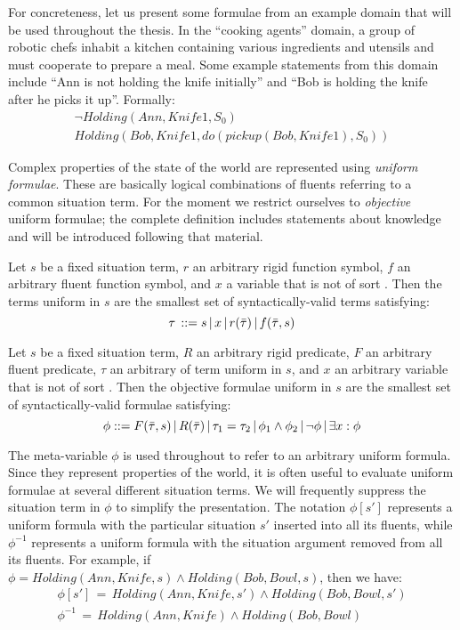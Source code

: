 \medskip{}


For concreteness, let us present some formulae from an example domain
that will be used throughout the thesis. In the {}``cooking agents''
domain, a group of robotic chefs inhabit a kitchen containing various
ingredients and utensils and must cooperate to prepare a meal. Some
example statements from this domain include {}``Ann is not holding
the knife initially'' and {}``Bob is holding the knife after he
picks it up''. Formally:\begin{gather*}
\neg Holding(Ann,Knife1,S_{0})\\
Holding(Bob,Knife1,do(pickup(Bob,Knife1),S_{0}))\end{gather*}


\medskip{}


Complex properties of the state of the world are represented using
\emph{uniform formulae}. These are basically logical combinations
of fluents referring to a common situation term. For the moment we
restrict ourselves to \emph{objective} uniform formulae; the complete
definition includes statements about knowledge and will be introduced
following that material.

\begin{defnL}
 Let $s$ be a fixed situation term, $r$
an arbitrary rigid function symbol, $f$ an arbitrary fluent function
symbol, and $x$ a variable that is not of sort .
Then the terms uniform in $s$ are the smallest set of syntactically-valid
terms satisfying:\[
\tau\,::=s\,|\, x\,|\, r(\bar{\tau})\,|\, f(\bar{\tau},s)\]

\begin{defnL}
 Let $s$ be a fixed situation
term, $R$ an arbitrary rigid predicate, $F$ an arbitrary fluent
predicate, $\tau$ an arbitrary of term uniform in $s$, and $x$
an arbitrary variable that is not of sort . Then the
objective formulae uniform in $s$ are the smallest set of syntactically-valid
formulae satisfying:\[
\phi::=F(\bar{\tau},s)\,|\, R(\bar{\tau})\,|\,\tau_{1}=\tau_{2}\,|\,\phi_{1}\wedge\phi_{2}\,|\,\neg\phi\,|\,\exists x:\phi\]

\end{defnL}
\end{defnL}
The meta-variable $\phi$ is used throughout to refer to an arbitrary
uniform formula. Since they represent properties of the world, it
is often useful to evaluate uniform formulae at several different
situation terms. We will frequently suppress the situation term in
$\phi$ to simplify the presentation. The notation $\phi[s']$ represents
a uniform formula with the particular situation $s'$ inserted into
all its fluents, while $\phi^{-1}$ represents a uniform formula with
the situation argument removed from all its fluents. For example,
if $\phi=Holding(Ann,Knife,s)\wedge Holding(Bob,Bowl,s)$, then we
have:\begin{gather*}
\phi[s']\,=\, Holding(Ann,Knife,s')\wedge Holding(Bob,Bowl,s')\\
\phi^{-1}\,=\, Holding(Ann,Knife)\wedge Holding(Bob,Bowl)\end{gather*}


